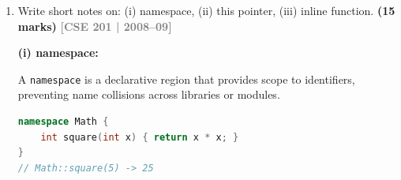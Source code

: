 \documentclass[12pt,a3paper]{article}
\newcommand{\yr}[1]{\hfill\textcolor{gray}{\small\textbf{[#1]}}}
\newcommand{\mk}[1]{\textcolor{orange!70!black}{\small\textbf{(#1 marks)}}}
\begin{document}
\begin{enumerate}
\begin{tcolorbox}[enhanced,breakable,ansbox,colback=cC!4,colframe=cC,
  boxrule=0.8pt,arc=5pt,
  title={\textbf{Answer --- Two restrictions on references}},
  fonttitle=\bfseries\color{white},colbacktitle=cC]
\begin{enumerate}[label=\textbf{\arabic*.}]
  \item \textbf{Must be initialised at declaration:}
\begin{lstlisting}[language=C++]
int x = 10;
int& r = x;   // OK
// int& r2;   // ERROR: must be initialised
\end{lstlisting}

  \item \textbf{Cannot be rebound to another variable:}
    Once bound, any assignment through the reference modifies the
    original variable; it does not rebind the reference.
\begin{lstlisting}[language=C++]
int a = 5, b = 20;
int& r = a;     // r refers to a
r = b;          // sets a = 20, does NOT rebind r to b
cout << a;      // 20
cout << (&r == &a); // 1 (true: r still refers to a)
\end{lstlisting}
\end{enumerate}

\textbf{Additional note:} A \texttt{const} reference can bind to a
temporary, but a non-const reference cannot:
\begin{lstlisting}[language=C++]
const int& cr = 5 + 3;  // OK: const ref binds to temporary
// int& r = 5 + 3;      // ERROR: non-const ref cannot bind to rvalue
\end{lstlisting}

\end{tcolorbox}

\item Write short notes on: (i) namespace, (ii) this pointer, (iii) inline function. \mk{15}
\yr{CSE 201 | 2008--09}

\begin{tcolorbox}[enhanced,breakable,ansbox,
  colback=cC!4,colframe=cC,boxrule=0.8pt,arc=5pt,
  title={\textbf{Answer --- namespace, this Pointer, inline Function}},
  fonttitle=\bfseries\color{white},colbacktitle=cC]

\textbf{(i) namespace:}

A \texttt{namespace} is a declarative region that provides scope to
identifiers, preventing name collisions across libraries or modules.

\begin{lstlisting}[language=C++]
namespace Math {
    int square(int x) { return x * x; }
}
// Math::square(5) -> 25
\end{lstlisting}


\end{tcolorbox}
\end{enumerate}
\end{document}
